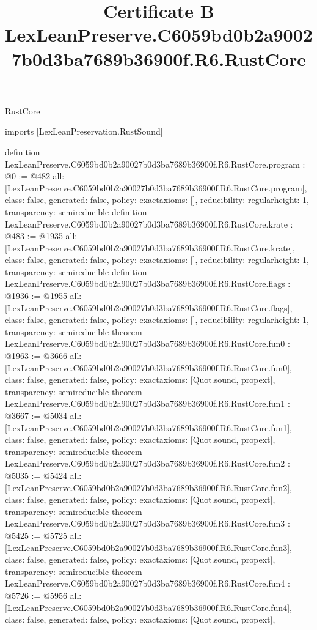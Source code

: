 \begin{lexlean}{RustCore}
\title{Certificate B LexLeanPreserve.C6059bd0b2a90027b0d3ba7689b36900f.R6.RustCore}
\begin{coremodule}
imports [LexLeanPreservation.RustSound]

definition LexLeanPreserve.C6059bd0b2a90027b0d3ba7689b36900f.R6.RustCore.program : @0 := @482 {
  all: [LexLeanPreserve.C6059bd0b2a90027b0d3ba7689b36900f.R6.RustCore.program],
  class: false,
  generated: false,
  policy: exact{axioms: []},
  reducibility: regular{height: 1},
  transparency: semireducible
}
definition LexLeanPreserve.C6059bd0b2a90027b0d3ba7689b36900f.R6.RustCore.krate : @483 := @1935 {
  all: [LexLeanPreserve.C6059bd0b2a90027b0d3ba7689b36900f.R6.RustCore.krate],
  class: false,
  generated: false,
  policy: exact{axioms: []},
  reducibility: regular{height: 1},
  transparency: semireducible
}
definition LexLeanPreserve.C6059bd0b2a90027b0d3ba7689b36900f.R6.RustCore.flags : @1936 := @1955 {
  all: [LexLeanPreserve.C6059bd0b2a90027b0d3ba7689b36900f.R6.RustCore.flags],
  class: false,
  generated: false,
  policy: exact{axioms: []},
  reducibility: regular{height: 1},
  transparency: semireducible
}
theorem LexLeanPreserve.C6059bd0b2a90027b0d3ba7689b36900f.R6.RustCore.fun0 : @1963 := @3666 {
  all: [LexLeanPreserve.C6059bd0b2a90027b0d3ba7689b36900f.R6.RustCore.fun0],
  class: false,
  generated: false,
  policy: exact{axioms: [Quot.sound, propext]},
  transparency: semireducible
}
theorem LexLeanPreserve.C6059bd0b2a90027b0d3ba7689b36900f.R6.RustCore.fun1 : @3667 := @5034 {
  all: [LexLeanPreserve.C6059bd0b2a90027b0d3ba7689b36900f.R6.RustCore.fun1],
  class: false,
  generated: false,
  policy: exact{axioms: [Quot.sound, propext]},
  transparency: semireducible
}
theorem LexLeanPreserve.C6059bd0b2a90027b0d3ba7689b36900f.R6.RustCore.fun2 : @5035 := @5424 {
  all: [LexLeanPreserve.C6059bd0b2a90027b0d3ba7689b36900f.R6.RustCore.fun2],
  class: false,
  generated: false,
  policy: exact{axioms: [Quot.sound, propext]},
  transparency: semireducible
}
theorem LexLeanPreserve.C6059bd0b2a90027b0d3ba7689b36900f.R6.RustCore.fun3 : @5425 := @5725 {
  all: [LexLeanPreserve.C6059bd0b2a90027b0d3ba7689b36900f.R6.RustCore.fun3],
  class: false,
  generated: false,
  policy: exact{axioms: [Quot.sound, propext]},
  transparency: semireducible
}
theorem LexLeanPreserve.C6059bd0b2a90027b0d3ba7689b36900f.R6.RustCore.fun4 : @5726 := @5956 {
  all: [LexLeanPreserve.C6059bd0b2a90027b0d3ba7689b36900f.R6.RustCore.fun4],
  class: false,
  generated: false,
  policy: exact{axioms: [Quot.sound, propext]},
}
\end{coremodule}
\end{lexlean}
